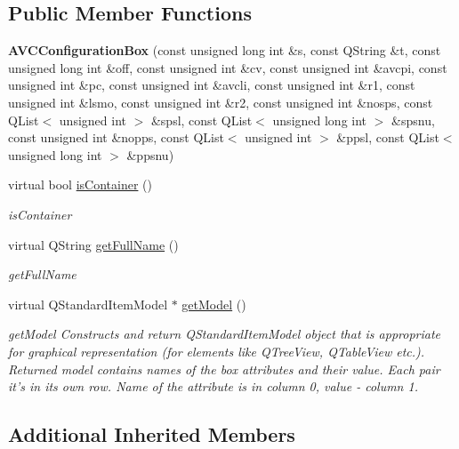 \subsection*{Public Member Functions}
\begin{DoxyCompactItemize}
\item 
\hypertarget{class_a_v_c_configuration_box_a260aa878eca69271d82241a2c649f50a}{{\bfseries A\-V\-C\-Configuration\-Box} (const unsigned long int \&s, const Q\-String \&t, const unsigned long int \&off, const unsigned int \&cv, const unsigned int \&avcpi, const unsigned int \&pc, const unsigned int \&avcli, const unsigned int \&r1, const unsigned int \&lsmo, const unsigned int \&r2, const unsigned int \&nosps, const Q\-List$<$ unsigned int $>$ \&spsl, const Q\-List$<$ unsigned long int $>$ \&spsnu, const unsigned int \&nopps, const Q\-List$<$ unsigned int $>$ \&ppsl, const Q\-List$<$ unsigned long int $>$ \&ppsnu)}\label{class_a_v_c_configuration_box_a260aa878eca69271d82241a2c649f50a}

\item 
virtual bool \hyperlink{class_a_v_c_configuration_box_a626fddbe3ea41877e8a8e97335948339}{is\-Container} ()
\begin{DoxyCompactList}\small\item\em is\-Container \end{DoxyCompactList}\item 
virtual Q\-String \hyperlink{class_a_v_c_configuration_box_a2cd37cfa63d1fa4130c6cd853a371e6f}{get\-Full\-Name} ()
\begin{DoxyCompactList}\small\item\em get\-Full\-Name \end{DoxyCompactList}\item 
virtual Q\-Standard\-Item\-Model $\ast$ \hyperlink{class_a_v_c_configuration_box_a034f358eb5231b98effd3835f81f538a}{get\-Model} ()
\begin{DoxyCompactList}\small\item\em get\-Model Constructs and return Q\-Standard\-Item\-Model object that is appropriate for graphical representation (for elements like Q\-Tree\-View, Q\-Table\-View etc.). Returned model contains names of the box attributes and their value. Each pair it's in its own row. Name of the attribute is in column 0, value -\/ column 1. \end{DoxyCompactList}\end{DoxyCompactItemize}
\subsection*{Additional Inherited Members}


